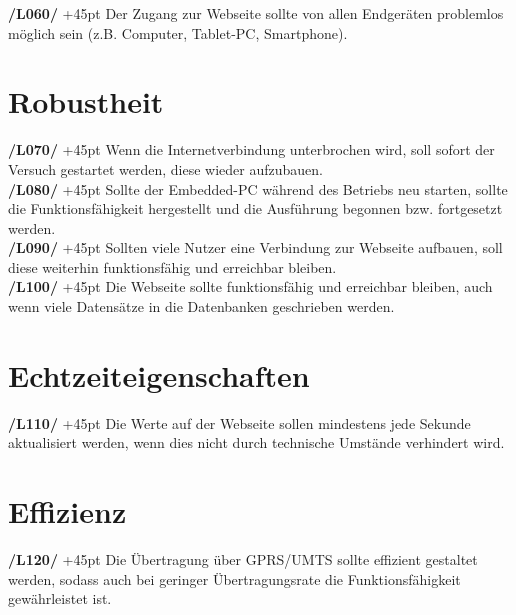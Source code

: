 \documentclass[fontsize = 12pt, paper = a4]{scrreprt}
\begin{document}
\textbf{/L060/} 
\hangindent+45pt 
Der Zugang zur Webseite sollte von allen Endgeräten problemlos möglich sein (z.B. Computer, \gls{Tablet-PC}, \gls{Smartphone}). 


\section{Robustheit}

\textbf{/L070/} 
\hangindent+45pt 
Wenn die Internetverbindung unterbrochen wird, soll sofort der Versuch gestartet werden, diese wieder aufzubauen. \\

\textbf{/L080/}
\hangindent+45pt 
Sollte der \gls{Embedded-PC} während des Betriebs neu starten, sollte die Funktionsfähigkeit hergestellt und die Ausführung begonnen bzw. fortgesetzt werden. \\

\textbf{/L090/} 
\hangindent+45pt 
Sollten viele Nutzer eine Verbindung zur Webseite aufbauen, soll diese weiterhin funktionsfähig und erreichbar bleiben. \\

\textbf{/L100/}
\hangindent+45pt 
Die Webseite sollte funktionsfähig und erreichbar bleiben, auch wenn viele Datensätze in die Datenbanken geschrieben werden. 


\section{Echtzeiteigenschaften}

\textbf{/L110/} 
\hangindent+45pt 
Die Werte auf der Webseite sollen mindestens jede Sekunde aktualisiert werden, wenn dies nicht durch technische Umstände verhindert wird. \\


\section{Effizienz}

\textbf{/L120/} 
\hangindent+45pt 
Die Übertragung über \gls{GPRS}/\gls{UMTS} sollte effizient gestaltet werden, sodass auch bei geringer Übertragungsrate die Funktionsfähigkeit gewährleistet ist. \\
\end{document}
